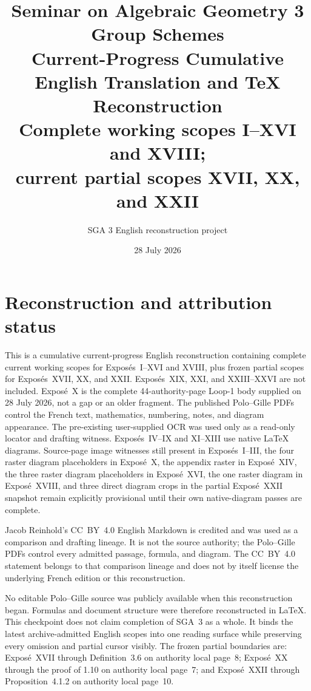 \documentclass[11pt,a4paper,oneside]{book}
\title{Seminar on Algebraic Geometry 3\\
  \large Group Schemes\\[0.75em]
  \normalsize Current-Progress Cumulative English Translation and
  \TeX{} Reconstruction\\
  \small Complete working scopes I--XVI and XVIII;\\
  current partial scopes XVII, XX, and XXII}
\author{SGA 3 English reconstruction project}
\date{28 July 2026}
\begin{document}
\frontmatter
\maketitle

\chapter*{Reconstruction and attribution status}
This is a cumulative current-progress English reconstruction containing
complete current working scopes for Expos\'es~I--XVI and XVIII, plus
frozen partial scopes for Expos\'es~XVII, XX, and XXII. Expos\'es~XIX,
XXI, and XXIII--XXVI are not included. Expos\'e~X is the complete
44-authority-page Loop-1 body supplied on 28 July 2026, not a gap or an
older fragment. The published Polo--Gille PDFs control the French text,
mathematics, numbering, notes, and diagram appearance. The pre-existing
user-supplied OCR was used only as a read-only locator and drafting
witness. Expos\'es~IV--IX and XI--XIII use native \LaTeX{} diagrams.
Source-page image witnesses still present in Expos\'es~I--III, the four
raster diagram placeholders in Expos\'e~X, the appendix raster in
Expos\'e~XIV, the three raster diagram placeholders in Expos\'e~XVI,
the one raster diagram in Expos\'e~XVIII, and three direct diagram crops
in the partial Expos\'e~XXII snapshot remain explicitly provisional
until their own native-diagram passes are complete.

Jacob Reinhold's CC~BY~4.0 English Markdown is credited and was used as
a comparison and drafting lineage. It is not the source authority; the
Polo--Gille PDFs control every admitted passage, formula, and diagram.
The CC~BY~4.0 statement belongs to that comparison lineage and does not
by itself license the underlying French edition or this reconstruction.

No editable Polo--Gille source was publicly available when this
reconstruction began. Formulas and document structure were therefore
reconstructed in \LaTeX{}. This checkpoint does not claim completion of
SGA~3 as a whole. It binds the latest archive-admitted English scopes into
one reading surface while preserving every omission and partial cursor
visibly. The frozen partial boundaries are: Expos\'e~XVII through
Definition~3.6 on authority local page~8; Expos\'e~XX through the proof
of 1.10 on authority local page~7; and Expos\'e~XXII through
Proposition~4.1.2 on authority local page~10.

\tableofcontents
\end{document}

